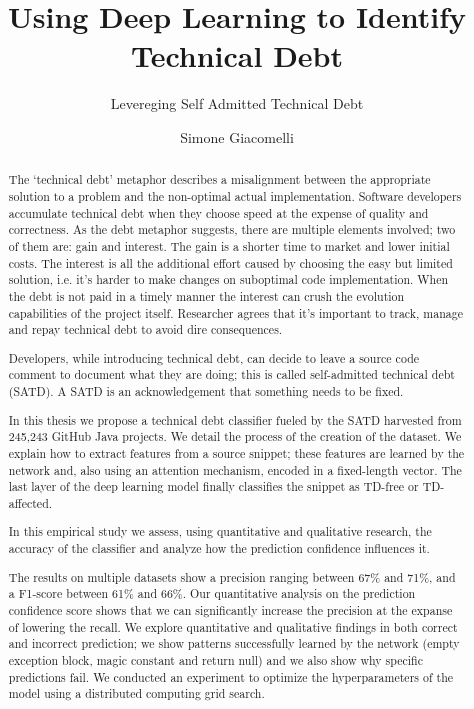 \documentclass[11pt, mscthesis]{usiinfthesis}
\title{Using Deep Learning to Identify Technical Debt} %
\subtitle{Levereging Self Admitted Technical Debt} %
\author{Simone Giacomelli} %
\begin{document}
\maketitle %

\frontmatter %

\begin{abstract}
The `technical debt' metaphor describes a misalignment between the appropriate solution to a problem and the non-optimal actual implementation. Software developers accumulate technical debt when they choose speed at the expense of quality and correctness. As the debt metaphor suggests, there are multiple elements involved; two of them are: gain and interest. The gain is a shorter time to market and lower initial costs. The interest is all the additional effort caused by choosing the easy but limited solution, i.e. it's harder to make changes on suboptimal code implementation. When the debt is not paid in a timely manner the interest can crush the evolution capabilities of the project itself. Researcher agrees that it's important to track, manage and repay technical debt to avoid dire consequences.

Developers, while introducing technical debt, can decide to leave a source code comment to document what they are doing; this is called self-admitted technical debt (SATD). A SATD is an acknowledgement that something needs to be fixed.

In this thesis we propose a technical debt classifier fueled by the SATD harvested from 245,243 GitHub Java projects. We detail the process of the creation of the dataset. We explain how to extract features from a source snippet; these features are learned by the network and, also using an attention mechanism, encoded in a fixed-length vector. The last layer of the deep learning model finally classifies the snippet as TD-free or TD-affected.  

In this empirical study we assess, using quantitative and qualitative research, the accuracy of the classifier and analyze how the prediction confidence influences it.

The results on multiple datasets show a precision ranging between 67\% and 71\%, and a F1-score between 61\% and 66\%. Our quantitative analysis on the prediction confidence score shows that we can significantly increase the precision at the expanse of lowering the recall. 
We explore quantitative and qualitative findings in both correct and incorrect prediction; we show patterns successfully learned by the network (empty exception block, magic constant and return null) and we also show why specific predictions fail. We conducted an experiment to optimize the hyperparameters of the model using a distributed computing grid search.



\end{abstract}
\end{document}
